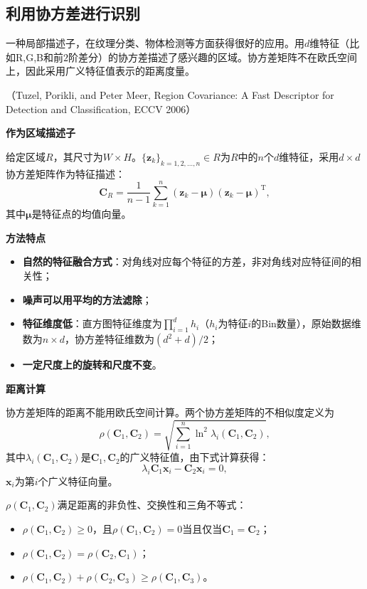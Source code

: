 \documentclass[11pt,a4paper]{report}
\theoremstyle{definition}
\begin{document}
\subsection{利用协方差进行识别}

一种局部描述子，在纹理分类、物体检测等方面获得很好的应用。用$d$维特征（比如R,G,B和前$2$阶差分）的协方差描述了感兴趣的区域。协方差矩阵不在欧氏空间上，因此采用广义特征值表示的距离度量。

（Tuzel, Porikli, and Peter Meer, Region Covariance: A Fast Descriptor for Detection and Classification, ECCV 2006）

\textbf{作为区域描述子}

给定区域$R$，其尺寸为$W\times H$。$\{\boldsymbol{z}_{k}\}_{k=1,2,\ldots,n}\in R$为$R$中的$n$个$d$维特征，采用$d\times d$协方差矩阵作为特征描述：
\[
\boldsymbol{C}_{R}=\frac{1}{n-1}\sum_{k=1}^{n}(\boldsymbol{z}_{k}-\boldsymbol{\mu})(\boldsymbol{z}_{k}-\boldsymbol{\mu})^{\mathrm{T}},
\]
其中$\boldsymbol{\mu}$是特征点的均值向量。

\textbf{方法特点}
\begin{itemize}[leftmargin=2em]
    \item \textbf{自然的特征融合方式}：对角线对应每个特征的方差，非对角线对应特征间的相关性；
    \item \textbf{噪声可以用平均的方法滤除}；
    \item \textbf{特征维度低}：直方图特征维度为$\prod_{i=1}^{d}h_{i}$（$h_{i}$为特征$i$的Bin数量），原始数据维数为$n\times d$，协方差特征维数为$(d^{2}+d)/2$；
    \item \textbf{一定尺度上的旋转和尺度不变}。
\end{itemize}

\textbf{距离计算}

协方差矩阵的距离不能用欧氏空间计算。两个协方差矩阵的不相似度定义为
\[
\rho(\boldsymbol{C}_{1},\boldsymbol{C}_{2})=\sqrt{\sum_{i=1}^{n}\ln^{2}\lambda_{i}(\boldsymbol{C}_{1},\boldsymbol{C}_{2})},
\]
其中$\lambda_{i}(\boldsymbol{C}_{1},\boldsymbol{C}_{2})$是$\boldsymbol{C}_{1},\boldsymbol{C}_{2}$的广义特征值，由下式计算获得：
\[
\lambda_{i}\boldsymbol{C}_{1}\boldsymbol{x}_{i}-\boldsymbol{C}_{2}\boldsymbol{x}_{i}=0,
\]
$\boldsymbol{x}_{i}$为第$i$个广义特征向量。

$\rho(\boldsymbol{C}_{1},\boldsymbol{C}_{2})$满足距离的非负性、交换性和三角不等式：
\begin{itemize}[leftmargin=2em]
    \item $\rho(\boldsymbol{C}_{1},\boldsymbol{C}_{2})\geq 0$，且$\rho(\boldsymbol{C}_{1},\boldsymbol{C}_{2})=0$当且仅当$\boldsymbol{C}_{1}=\boldsymbol{C}_{2}$；
    \item $\rho(\boldsymbol{C}_{1},\boldsymbol{C}_{2})=\rho(\boldsymbol{C}_{2},\boldsymbol{C}_{1})$；
    \item $\rho(\boldsymbol{C}_{1},\boldsymbol{C}_{2})+\rho(\boldsymbol{C}_{2},\boldsymbol{C}_{3})\geq\rho(\boldsymbol{C}_{1},\boldsymbol{C}_{3})$。
\end{itemize}
\end{document}
